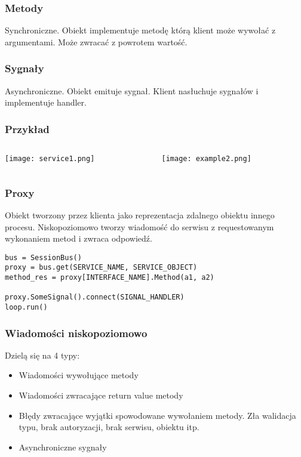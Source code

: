 \begin{frame}
    \frametitle{Metody}
    Synchroniczne. Obiekt implementuje metodę którą
    klient może wywołać z argumentami. Może zwracać
    z powrotem wartość.
\end{frame}

\begin{frame}
    \frametitle{Sygnały}
    Asynchroniczne. Obiekt emituje sygnał.
    Klient nasłuchuje sygnałów i implementuje handler.
\end{frame}


\begin{frame}
    \frametitle{Przykład}
    \begin{columns}
    \begin{column}{0.5\textwidth}
        \begin{center}
            \texttt{[image: service1.png]}
        \end{center}
    \end{column}
    \begin{column}{0.5\textwidth}
        \begin{center}
            \texttt{[image: example2.png]}        
        \end{center}
    \end{column}
\end{columns}
\end{frame}



\begin{frame}[fragile]
    \frametitle{Proxy}
    Obiekt tworzony przez klienta jako reprezentacja
    zdalnego obiektu innego procesu. Niskopoziomowo tworzy
    wiadomość do serwisu z requestowanym wykonaniem metod i zwraca
    odpowiedź.

    \begin{flushleft}
        \begin{lstlisting}
bus = SessionBus()
proxy = bus.get(SERVICE_NAME, SERVICE_OBJECT)
method_res = proxy[INTERFACE_NAME].Method(a1, a2)

proxy.SomeSignal().connect(SIGNAL_HANDLER)
loop.run()
        \end{lstlisting}      
    \end{flushleft}

\end{frame}

\begin{frame}
    \frametitle{Wiadomości niskopoziomowo}
    Dzielą się na 4 typy:
    \begin{itemize}
        \item Wiadomości wywołujące metody
        \item Wiadomości zwracające return value metody
        \item Błędy zwracające wyjątki spowodowane 
        wywołaniem metody. Zła walidacja typu, 
        brak autoryzacji, brak serwisu, obiektu itp.
        \item Asynchroniczne sygnały
    \end{itemize}
\end{frame}

